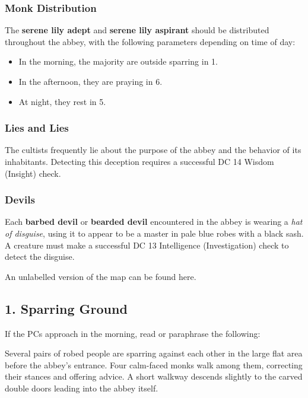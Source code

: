 \documentclass[10pt,a4paper,twoside,bg=print,twocolumn,openany,nodeprecatedcode]{dndbook}
\begin{document}
\subsubsection{Monk Distribution}
The \textbf{serene lily adept} and \textbf{serene lily aspirant} should be distributed throughout the abbey, with the following parameters depending on time of day:


\begin{itemize}
\item In the morning, the majority are outside sparring in 1.
\item In the afternoon, they are praying in 6.
\item At night, they rest in 5.
\end{itemize}

\subsubsection{Lies and Lies}
The cultists frequently lie about the purpose of the abbey and the behavior of its inhabitants. Detecting this deception requires a successful DC 14 Wisdom (Insight) check.

\subsubsection{Devils}
Each \textbf{barbed devil} or \textbf{bearded devil} encountered in the abbey is wearing a \textit{hat of disguise}, using it to appear to be a master in pale blue robes with a black sash. A creature must make a successful DC 13 Intelligence (Investigation) check to detect the disguise.

An unlabelled version of the map can be found here.

\subsection{1. Sparring Ground}
If the PCs approach in the morning, read or paraphrase the following:

\begin{DndReadAloud}{}
Several pairs of robed people are sparring against each other in the large flat area before the abbey's entrance. Four calm-faced monks walk among them, correcting their stances and offering advice. A short walkway descends slightly to the carved double doors leading into the abbey itself.

\end{DndReadAloud}
\end{document}
